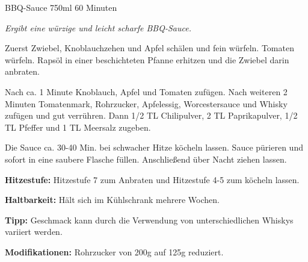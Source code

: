 \documentclass[
  DIV=11,%
  pagesize,%
  fontsize=11pt,%
  paper=a4,%
]{scrartcl}
\begin{document}
\begin{recipe}{BBQ-Sauce} {750ml} {60 Minuten}

\freeform
\textit{Ergibt eine würzige und leicht scharfe BBQ-Sauce.}


Zuerst Zwiebel, Knoblauchzehen und Apfel schälen und fein würfeln.
Tomaten würfeln.
Rapsöl in einer beschichteten Pfanne erhitzen und die Zwiebel darin anbraten.


Nach ca. 1 Minute Knoblauch, Apfel und Tomaten zufügen.
Nach weiteren 2 Minuten Tomatenmark, Rohrzucker, Apfelessig, Worcestersauce und Whisky zufügen und gut verrühren.
Dann 1/2 TL Chilipulver, 2 TL Paprikapulver, 1/2 TL Pfeffer und 1 TL Meersalz zugeben.

\newstep
Die Sauce ca. 30-40 Min. bei schwacher Hitze köcheln lassen.
Sauce pürieren und sofort in eine saubere Flasche füllen.
Anschließend über Nacht ziehen lassen.

\freeform
\hrulefill

\freeform
\textbf{Hitzestufe:}
Hitzestufe 7 zum Anbraten und Hitzestufe 4-5 zum köcheln lassen.

\freeform 
\textbf{Haltbarkeit:}
Hält sich im Kühlschrank mehrere Wochen.

\freeform 
\textbf{Tipp:}
Geschmack kann durch die Verwendung von unterschiedlichen Whiskys variiert werden.

\freeform 
\textbf{Modifikationen:}
Rohrzucker von 200g auf 125g reduziert.

\end{recipe}
\end{document}
